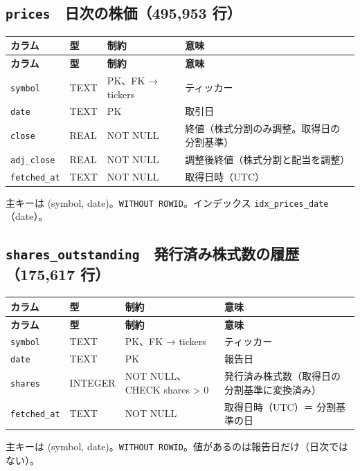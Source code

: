 \documentclass[xelatex,ja=standard,jafont=hiragino-pron,a4paper,10pt]{bxjsreport}
\begin{document}
\subsection*{\texttt{prices}　日次の株価（495,953 行）}
{\footnotesize
\begin{longtable}{p{3.30cm}p{1.40cm}p{3.00cm}p{6.40cm}}
\toprule
\textbf{カラム} & \textbf{型} & \textbf{制約} & \textbf{意味} \\
\midrule
\endfirsthead
\toprule
\textbf{カラム} & \textbf{型} & \textbf{制約} & \textbf{意味} \\
\midrule
\endhead
\bottomrule
\endfoot
\texttt{symbol} & TEXT & PK、FK → tickers & ティッカー \\
\texttt{date} & TEXT & PK & 取引日 \\
\texttt{close} & REAL & NOT NULL & 終値（株式分割のみ調整。取得日の分割基準） \\
\texttt{adj\_\allowbreak{}close} & REAL & NOT NULL & 調整後終値（株式分割と配当を調整） \\
\texttt{fetched\_\allowbreak{}at} & TEXT & NOT NULL & 取得日時（UTC） \\
\end{longtable}
}
{\small 主キーは (symbol, date)。\texttt{WITHOUT ROWID}。インデックス \texttt{idx\_\allowbreak{}prices\_\allowbreak{}date}（date）。\par}
\medskip
\subsection*{\texttt{shares\_\allowbreak{}outstanding}　発行済み株式数の履歴（175,617 行）}
{\footnotesize
\begin{longtable}{p{3.30cm}p{1.40cm}p{3.00cm}p{6.40cm}}
\toprule
\textbf{カラム} & \textbf{型} & \textbf{制約} & \textbf{意味} \\
\midrule
\endfirsthead
\toprule
\textbf{カラム} & \textbf{型} & \textbf{制約} & \textbf{意味} \\
\midrule
\endhead
\bottomrule
\endfoot
\texttt{symbol} & TEXT & PK、FK → tickers & ティッカー \\
\texttt{date} & TEXT & PK & 報告日 \\
\texttt{shares} & INTEGER & NOT NULL、CHECK shares \textgreater{} 0 & 発行済み株式数（取得日の分割基準に変換済み） \\
\texttt{fetched\_\allowbreak{}at} & TEXT & NOT NULL & 取得日時（UTC）＝ 分割基準の日 \\
\end{longtable}
}
{\small 主キーは (symbol, date)。\texttt{WITHOUT ROWID}。値があるのは報告日だけ（日次ではない）。\par}
\medskip
\end{document}

